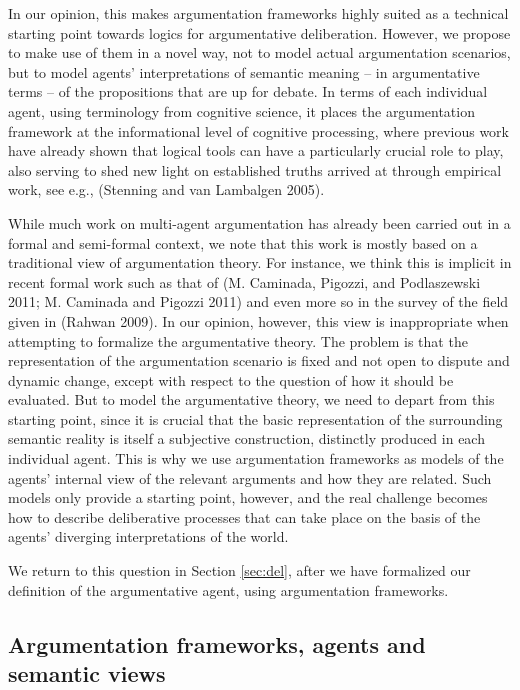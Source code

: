\documentclass[greybox]{svmult}
\begin{document}
In our opinion, this makes argumentation frameworks highly suited as a technical starting point towards logics for argumentative deliberation. However, we propose to make use of them in a novel way, not to model actual argumentation scenarios, but to model agents' interpretations of semantic meaning -- in argumentative terms -- of the propositions that are up for debate.  In terms of each individual agent, using terminology from cognitive science, it places the argumentation framework at the informational level of cognitive processing, where previous work have already shown that logical tools can have a particularly crucial role to play, also serving to shed new light on established truths arrived at through empirical work, see e.g., (Stenning and van Lambalgen 2005). 

While much work on multi-agent argumentation has already been carried out in a formal and semi-formal context, we note that this work is mostly based on a traditional view of argumentation theory. For instance, we think this is implicit in recent formal work such as that of  (M. Caminada, Pigozzi, and Podlaszewski 2011; M. Caminada and Pigozzi 2011) and even more so in the survey of the field given in (Rahwan 2009). In our opinion, however, this view is inappropriate when attempting to formalize the argumentative theory.
The problem is that the representation of the argumentation scenario is fixed and not open to dispute and dynamic change, except with respect to the question of how it should be evaluated. But to model the argumentative theory, we need to depart from this starting point, since it is crucial that the basic representation of the surrounding semantic reality is itself a subjective construction, distinctly produced in each individual agent. This is why we use argumentation frameworks as models of the agents' internal view of the relevant arguments and how they are related. Such models only provide a starting point, however, and the real challenge becomes how to describe deliberative processes that can take place on the basis of the agents' diverging interpretations of the world.

We return to this question in Section \ref{sec:del}, after we have formalized our definition of the argumentative agent, using argumentation frameworks.

\subsection{Argumentation frameworks, agents and semantic views}\label{subsec:arg}
\end{document}
